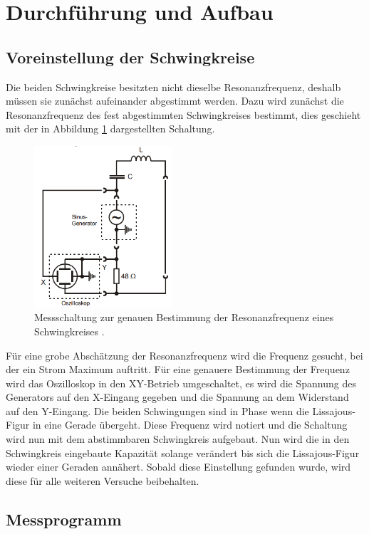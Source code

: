 \section{Durchführung und Aufbau}
\label{sec:Durchführung}

\subsection{Voreinstellung der Schwingkreise}
Die beiden Schwingkreise besitzten nicht dieselbe Resonanzfrequenz, deshalb müssen sie zunächst aufeinander abgestimmt werden. Dazu wird zunächst die Resonanzfrequenz des fest abgestimmten Schwingkreises bestimmt, dies geschieht mit der in Abbildung \ref{fig:ResFrequenz} dargestellten Schaltung.

\begin{figure}[H]
  \centering
  \includegraphics[height=6cm]{picture/BestimmungDerResFrequenz.PNG}
  \caption{Messschaltung zur genauen Bestimmung der Resonanzfrequenz eines Schwingkreises \cite{sample}.}
  \label{fig:ResFrequenz}
\end{figure}

Für eine grobe Abschätzung der Resonanzfrequenz wird die Frequenz gesucht, bei der ein Strom Maximum auftritt. Für eine genauere Bestimmung der Frequenz wird das Oszilloskop in den XY-Betrieb umgeschaltet, es wird die Spannung des Generators auf den X-Eingang gegeben und die Spannung an dem Widerstand auf den Y-Eingang. Die beiden Schwingungen sind in Phase wenn die Lissajous-Figur in eine Gerade übergeht. Diese Frequenz wird notiert und die Schaltung wird nun mit dem abstimmbaren Schwingkreis aufgebaut. Nun wird die in den Schwingkreis eingebaute Kapazität solange verändert bis sich die Lissajous-Figur wieder einer Geraden annähert. Sobald diese Einstellung gefunden wurde, wird diese für alle weiteren Versuche beibehalten.

\subsection{Messprogramm}

